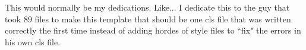 This would normally be my dedications. Like... I dedicate this to the guy that took 89 files to make this template that should be one cls file that was written correctly the first time instead of adding hordes of style files to ``fix" the errors in his own cls file.